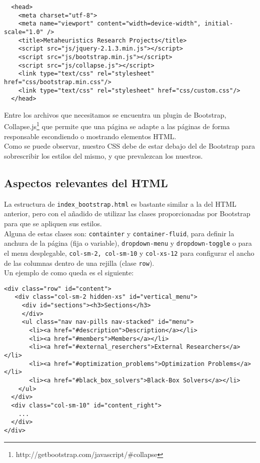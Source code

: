 \documentclass[10pt,a4paper]{article}
\begin{document}
\begin{verbatim}
  <head>
    <meta charset="utf-8">
    <meta name="viewport" content="width=device-width", initial-scale="1.0" />
    <title>Metaheuristics Research Projects</title>
    <script src="js/jquery-2.1.3.min.js"></script>
    <script src="js/bootstrap.min.js"></script>
    <script src="js/collapse.js"></script>
    <link type="text/css" rel="stylesheet" href="css/bootstrap.min.css"/>
    <link type="text/css" rel="stylesheet" href="css/custom.css"/>
  </head>
\end{verbatim}

Entre los archivos que necesitamos se encuentra un plugin de Bootstrap, Collapse.js\footnote{http://getbootstrap.com/javascript/\#collapse} que permite que una página se adapte a las páginas de forma responsable escondiendo o mostrando elementos HTML.\\

Como se puede observar, nuestro CSS debe de estar debajo del de Bootstrap para sobrescribir los estilos del mismo, y que prevalezcan los nuestros.

\subsection{Aspectos relevantes del HTML}

La estructura de \texttt{index\_bootstrap.html} es bastante similar a la del HTML anterior, pero con el añadido de utilizar las clases proporcionadas por Bootstrap para que se apliquen sus estilos.\\

Alguna de estas clases son:  \texttt{containter} y  \texttt{container-fluid}, para definir la anchura de la página (fija o variable),  \texttt{dropdown-menu} y  \texttt{dropdown-toggle} o para el menu desplegable, \texttt{col-sm-2, col-sm-10} y \texttt{col-xs-12} para configurar el ancho de las columnas dentro de una rejilla (clase \texttt{row}).\\

Un ejemplo de como queda es el siguiente:\\

\begin{verbatim}
<div class="row" id="content">
   <div class="col-sm-2 hidden-xs" id="vertical_menu">
     <div id="sections"><h3>Sections</h3>
     </div>
     <ul class="nav nav-pills nav-stacked" id="menu">
       <li><a href="#description">Description</a></li>
       <li><a href="#members">Members</a></li>
       <li><a href="#external_reserchers">External Researchers</a></li>
       <li><a href="#optimization_problems">Optimization Problems</a></li>
       <li><a href="#black_box_solvers">Black-Box Solvers</a></li>
    </ul>
  </div>
  <div class="col-sm-10" id="content_right">
    ...
  </div>
</div> 
\end{verbatim}
\end{document}
